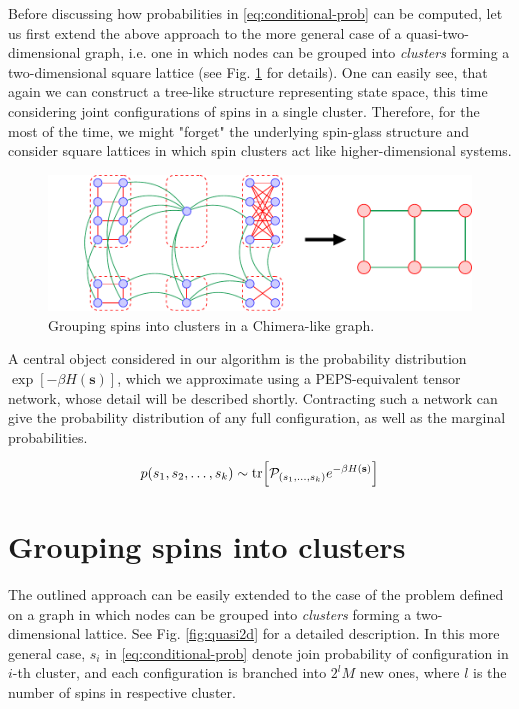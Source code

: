 Before discussing how probabilities in \eqref{eq:conditional-prob} can be
computed, let us first extend the above approach to the more general case of a
quasi-two-dimensional graph, i.e. one in which nodes can be grouped into
\emph{clusters} forming a two-dimensional square lattice (see Fig.
\ref{fig:clustering} for details). One can easily see, that again we can
construct a tree-like structure representing state space, this time considering
joint configurations of spins in a single cluster. Therefore, for the most of
the time, we might "forget" the underlying spin-glass structure and consider
square lattices in which spin clusters act like higher-dimensional systems.

\begin{figure}
  \includegraphics[width=\textwidth]{figures/clustering}
  \caption{Grouping spins into clusters in a Chimera-like graph.} \label{fig:clustering}
\end{figure}

A central object considered in our algorithm is the probability distribution
$\exp[-\beta H(\mathbf{s})]$, which we approximate using a PEPS-equivalent
tensor network, whose detail will be described shortly. Contracting such a
network can give the probability distribution of any full configuration, as
well as the marginal probabilities.

\begin{equation}
  p(s_1, s_2, \ldots, s_k) \sim \tr[\mathcal{P}_{(s_1, \ldots, s_k)} e^{-\beta H(\mathbf{s})}]
\end{equation}

\section{Grouping spins into clusters}
The outlined approach can be easily extended to the case of the problem defined
on a graph in which nodes can be grouped into \emph{clusters} forming a
two-dimensional lattice. See Fig. \ref{fig:quasi2d} for a detailed description.
In this more general case, $s_i$ in \eqref{eq:conditional-prob} denote join
probability of configuration in $i$-th cluster, and each configuration is
branched into $2^lM$ new ones, where $l$ is the number of spins in respective
cluster.

